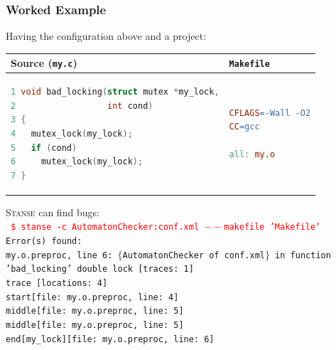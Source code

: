 \documentclass[xcolor=dvipsnames]{beamer}
\begin{document}
\begin{frame}[fragile]
  \frametitle{Worked Example}
  Having the configuration above and a project:
  \begin{center}
  \begin{tabular}{|l|l|} \hline
  Source (\texttt{my.c}) & \texttt{Makefile} \\ \hline \hline
  \begin{lstlisting}[language=C]
1 void bad_locking(struct mutex *my_lock,
2                  int cond)
3 {
4   mutex_lock(my_lock);
5   if (cond)
6     mutex_lock(my_lock);
7 }
  \end{lstlisting}
  &
  \begin{lstlisting}[language=make]
CFLAGS=-Wall -O2
CC=gcc

all: my.o
  \end{lstlisting} \\ \hline
  \end{tabular}
  \end{center}

  \pause

  \textsc{Stanse} can find bugs: \\
{\scriptsize\texttt{%
\textcolor{red}{\$ stanse -c AutomatonChecker:conf.xml $--$makefile
'Makefile'} \\
\pause
Error(s) found: \\
my.o.preproc, line 6: $\{$AutomatonChecker of conf.xml$\}$ in function 'bad\_locking' double lock [traces: 1] \\
trace [locations: 4] \\
start[file: my.o.preproc, line: 4] \\
middle[file: my.o.preproc, line: 5] \\
middle[file: my.o.preproc, line: 5] \\
end[my\_lock][file: my.o.preproc, line: 6] \\
}}

\end{frame}
\end{document}
